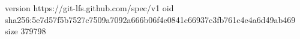 version https://git-lfs.github.com/spec/v1
oid sha256:5e7d57f5b7527c7509a7092a666b06f4e0841c66937c3fb761c4e4a6d49ab469
size 379798

